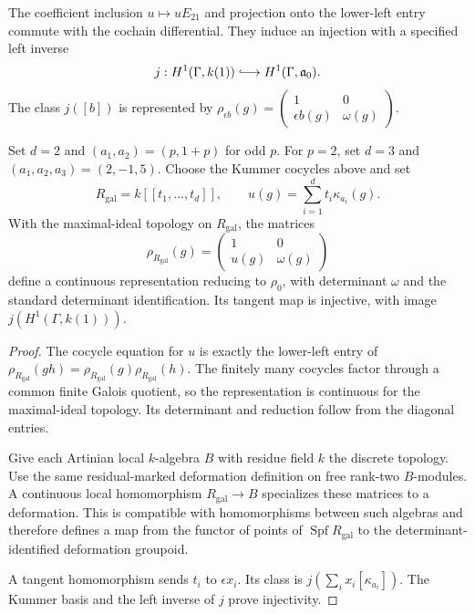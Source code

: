The coefficient inclusion \(u\mapsto uE_{21}\) and projection onto
the lower-left entry commute with the cochain differential. They induce
an injection with a specified left inverse
\[
 j:H^1(\Gamma,k(1))\lhook\joinrel\longrightarrow H^1(\Gamma,\mathfrak a_0).
\]
The class \(j([b])\) is represented by
\(\rho_{\epsilon b}(g)=\left(\begin{smallmatrix}1&0\\\epsilon b(g)&\omega(g)\end{smallmatrix}\right)\).

\begin{theorem}
\label{v4-arith:ic:local-cyclotomic:formal-family}
Set \(d=2\) and \((a_1,a_2)=(p,1+p)\) for odd \(p\).
For \(p=2\), set \(d=3\) and \((a_1,a_2,a_3)=(2,-1,5)\).
Choose the Kummer cocycles above and set
\[
 R_{\mathrm{gal}}=k[[t_1,\ldots,t_d]],\qquad
 u(g)=\sum_{i=1}^d t_i\kappa_{a_i}(g).
\]
With the maximal-ideal topology on \(R_{\mathrm{gal}}\), the matrices
\[
 \rho_{R_{\mathrm{gal}}}(g)=\begin{pmatrix}1&0\\u(g)&\omega(g)\end{pmatrix}
\]
define a continuous representation reducing to \(\rho_0\), with
determinant \(\omega\) and the standard determinant identification.
Its tangent map is injective, with image \(j(H^1(\Gamma,k(1)))\).
\end{theorem}

\begin{proof}
The cocycle equation for \(u\) is exactly the lower-left entry of
\(\rho_{R_{\mathrm{gal}}}(gh)=\rho_{R_{\mathrm{gal}}}(g)\rho_{R_{\mathrm{gal}}}(h)\).
The finitely many cocycles factor through a common finite Galois quotient,
so the representation is continuous for the maximal-ideal topology.
Its determinant and reduction follow from the diagonal entries.

Give each Artinian local \(k\)-algebra \(B\) with residue field \(k\)
the discrete topology. Use the same residual-marked deformation
definition on free rank-two \(B\)-modules. A continuous local
homomorphism \(R_{\mathrm{gal}}\to B\) specializes these matrices
to a deformation. This is compatible with homomorphisms between such
algebras and therefore defines a map from the functor of points of
\(\operatorname{Spf}R_{\mathrm{gal}}\) to the determinant-identified deformation groupoid.

A tangent homomorphism sends \(t_i\) to \(\epsilon x_i\).
Its class is \(j(\sum_i x_i[\kappa_{a_i}])\).
The Kummer basis and the left inverse of \(j\) prove injectivity.
\end{proof}


